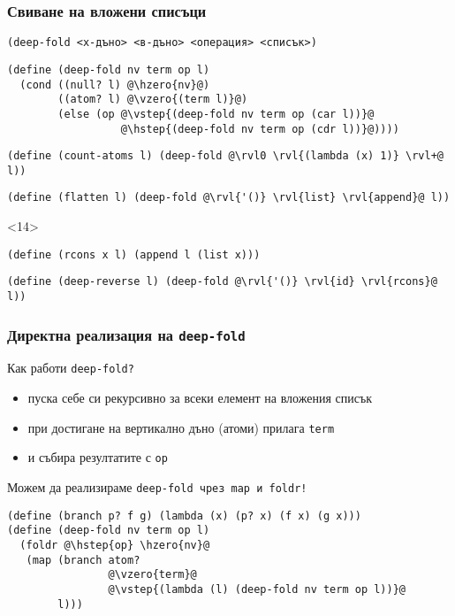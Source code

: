 \documentclass{beamer}
\begin{document}
\begin{frame}[fragile]
  \frametitle{Свиване на вложени списъци}

  \tt{(deep-fold }<х-дъно> <в-дъно> <операция> <списък>\tt)\\
  \pause
  \onslide<+->
\begin{lstlisting}
(define (deep-fold nv term op l)
  (cond ((null? l) @\hzero{nv}@)
        ((atom? l) @\vzero{(term l)}@)
        (else (op @\vstep{(deep-fold nv term op (car l))}@
                  @\hstep{(deep-fold nv term op (cdr l))}@))))
\end{lstlisting}
  \onslide<+->
\begin{lstlisting}
(define (count-atoms l) (deep-fold @\rvl0 \rvl{(lambda (x) 1)} \rvl+@ l))
\end{lstlisting}
  \onslide<+->
\begin{lstlisting}
(define (flatten l) (deep-fold @\rvl{'()} \rvl{list} \rvl{append}@ l))
\end{lstlisting}
  \onslide<+->
  \begin{visibleenv}<14>
\begin{lstlisting}
(define (rcons x l) (append l (list x)))\end{lstlisting}%
  \end{visibleenv}%
\begin{lstlisting}
(define (deep-reverse l) (deep-fold @\rvl{'()} \rvl{id} \rvl{rcons}@ l))
\end{lstlisting}
\end{frame}

\begin{frame}[fragile]
  \frametitle{Директна реализация на \tt{deep-fold}}

  Как работи \tt{deep-fold}?
  \pause
  \begin{itemize}[<+->]
  \item пуска себе си рекурсивно за всеки елемент на вложения списък
  \item при достигане на вертикално дъно (атоми) прилага \tt{term}
  \item и събира резултатите с \tt{op}
  \end{itemize}
  \onslide<+->
  Можем да реализираме \tt{deep-fold} чрез \tt{map} и \tt{foldr}!
  \onslide<+->
\begin{lstlisting}
(define (branch p? f g) (lambda (x) (p? x) (f x) (g x)))
(define (deep-fold nv term op l)
  (foldr @\hstep{op} \hzero{nv}@
   (map (branch atom?
                @\vzero{term}@
                @\vstep{(lambda (l) (deep-fold nv term op l))}@
        l)))
\end{lstlisting}
\end{frame}
\end{document}
